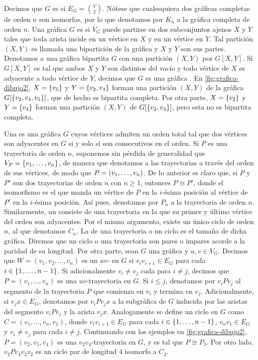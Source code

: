 Decimos que $G$ es  si $E_G=\binom{V}{2}$.
N\'otese que cualesquiera dos gr\'aficas completas de orden $n$ son isomorfas,
por lo que denotamos por $K_n$ a la gr\'afica completa de orden $n$. Una
gr\'afica $G$ es  si $V_G$ puede partirse en dos
subconjuntos ajenos $X$ y $Y$ tales que toda arista incide en un v\'ertice en
$X$ y en un v\'ertice en $Y$. Tal partici\'on $(X,Y)$ es llamada una
bipartici\'on de la gr\'afica y $X$ y $Y$ son sus partes. Denotamos a una
gr\'afica bipartita $G$ con una partici\'on $(X,Y)$ por $G[X,Y]$. Si $G[X,Y]$ es
tal que ambos $X$ y $Y$ son distintos del vac\'io y todo v\'ertice de $X$ es
adyacente a todo v\'ertice de $Y$, decimos que $G$ es una gr\'afica
. En \cref{fig:grafica-dibujo2},
$X=\left\{ v_5\right\}$ y $Y=\left\{ v_2,v_4\right\}$ forman una partici\'on $(X,Y)$ de la gr\'afica
$G[\left\{ v_2,v_4,v_5\right\}]$, que de hecho es bipartita completa. Por otra parte,
$X=\left\{ v_2\right\}$ y $Y=\left\{ v_4\right\}$ forman una partici\'on $(X,Y)$ de $G[\left\{ v_2,v_4\right\}]$,
pero esta no es bipartita completa.

Una  es una gr\'afica $G$ cuyos v\'ertices admiten un orden
total tal que dos v\'ertices son adyacentes en $G$ si y solo si son consecutivos
en el orden. Si $P$ es una trayectoria de orden $n$, suponemos sin p\'erdida de
generalidad que $V_P=\left\{ v_1,\dots,v_n\right\}$, de manera que denotamos a las
trayectorias a trav\'es del orden de sus v\'ertices, de modo que
$P=\left( v_1,\dots,v_n\right)$. De lo anterior es claro que, si $P$ y $P'$ son dos
trayectorias de orden $n$ con $n\ge 1$, entonces $P\cong P'$, donde el
isomorfismo es el que manda un v\'ertice de $P$ en la $i$-\'esima posici\'on al
v\'ertice de $P'$ en la $i$-\'esima posici\'on. As\'i pues, denotamos por $P_n$
a la trayectoria de orden $n$. Similarmente, un  consiste de una
trayectoria en la que su primer y \'ultimo v\'ertice del orden son adyacentes.
Por el mismo argumento, existe un \'unico ciclo de orden $n$, al que denotamos
$C_n$. La  de una trayectoria o un ciclo es el tama\~no de
dicha gr\'afica. Diremos que un ciclo o una trayectoria son pares o impares
acorde a la paridad de su longitud. Por otra parte, sean $G$ una gr\'afica y
$u,v\in V_G$. Decimos que $W=(v_1,v_2,\dots, v_n)$ es un $uv$- en
$G$ si $v_iv_{i+1}\in E_G$ para cada $i\in\{1,\dots, n-1\}$. Si adicionalmente
$v_i\neq v_j$ cada para $i\neq j$, decimos que $P=(v_1,\dots, v_n)$ es una
$uv$-trayectoria en $G$. Si $i\leq j$, denotamos por $v_iPv_j$ al segmento de la
trayectoria $P$ que comienza en $v_i$ y termina en $v_j$. Adicionalmente, si
$v_jx\in E_G$, denotamos por $v_iPv_jx$ a la subgr\'afica de $G$ inducida por
las aristas del segmento $v_iPv_j$ y la arista $v_jx$. Analogamente se define un
ciclo en $G$ como $C=(v_1,\dots,v_n,v_1)$, donde $v_{i}v_{i+1}\in E_G$ para cada
$i\in\{1,\dots, n-1\}$, $v_nv_1\in E_G$ y $v_i\neq v_j$ para cada $i\neq j$.
Continuando con los ejemplos en \cref{fig:grafica-dibujo2}, $P=(v_2,v_5,v_4)$ es
una $v_2v_4$-trayectoria en $G$, y es tal que $P\cong P_3$. Por otro lado,
$v_2Pv_4v_3v_2$ es un ciclo par de longitud $4$ isomorfo a $C_4$.

